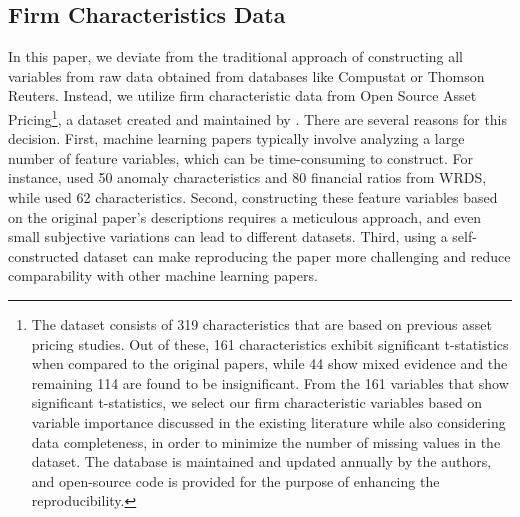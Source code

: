 \subsection{Firm Characteristics Data}

In this paper, we deviate from the traditional approach of constructing all variables from raw data obtained from databases like Compustat or Thomson Reuters. Instead, we utilize firm characteristic data from Open Source Asset Pricing\footnote{The dataset consists of 319 characteristics that are based on previous asset pricing studies. Out of these, 161 characteristics exhibit significant t-statistics when compared to the original papers, while 44 show mixed evidence and the remaining 114 are found to be insignificant. From the 161 variables that show significant t-statistics, we select our firm characteristic variables based on variable importance discussed in the existing literature while also considering data completeness, in order to minimize the number of missing values in the dataset. The database is maintained and updated annually by the authors, and open-source code is provided for the purpose of enhancing the reproducibility.}, a dataset created and maintained by \citet*{chen2021open}. There are several reasons for this decision. First, machine learning papers typically involve analyzing a large number of feature variables, which can be time-consuming to construct. For instance, \citet*{kozak2020shrinking} used 50 anomaly characteristics and 80 financial ratios from WRDS, while \citet*{freyberger2020dissecting} used 62 characteristics. Second, constructing these feature variables based on the original paper's descriptions requires a meticulous approach, and even small subjective variations can lead to different datasets. Third, using a self-constructed dataset can make reproducing the paper more challenging and reduce comparability with other machine learning papers.

